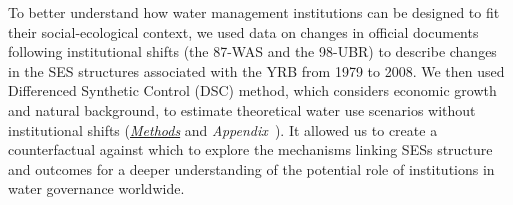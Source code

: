 To better understand how water management institutions can be designed to fit their social-ecological context, we used data on changes in official documents following institutional shifts (the 87-WAS and the 98-UBR) to describe changes in the SES structures associated with the YRB from 1979 to 2008.
We then used Differenced Synthetic Control (DSC) method, which considers economic growth and natural background, to estimate theoretical water use scenarios without institutional shifts (\textit{\hyperref[{sec:methods}]{Methods}} and \textit{Appendix~}).
It allowed us to create a counterfactual against which to explore the mechanisms linking SESs structure and outcomes for a deeper understanding of the potential role of institutions in water governance worldwide.
